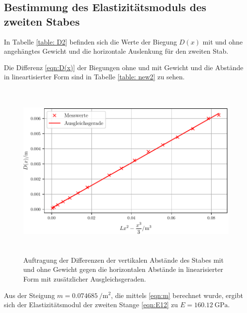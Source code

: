 \subsection{Bestimmung des Elastizitätsmoduls des zweiten Stabes}


In Tabelle \ref{table: D2} befinden sich die Werte der Biegung $D(x)$
mit und ohne angehängtes Gewicht und die horizontale Auslenkung %
für den zweiten Stab.

\noindent Die Differenz \eqref{eqn:D(x)} der Biegungen ohne und mit Gewicht und die Abstände in
lineartisierter Form sind in Tabelle \ref{table: new2} zu sehen.

\begin{figure}

  \centering
  \includegraphics[width=12cm, height=9cm]{./plots/Stange2.pdf}
  \caption{Auftragung der Differenzen der vertikalen Abstände des Stabes mit und ohne Gewicht gegen die horizontalen Abstände in linearisierter Form mit zusätzlicher Ausgleichsgeraden.}
  \label{fig:plot2}
\end{figure}
Aus der Steigung $m = \SI[per-mode=fraction]{0.074685}{\per\square\meter}$, die mittels \eqref{eqn:m}
berechnet wurde, ergibt sich der Elastizitätsmodul der zweiten Stange \eqref{eqn:E12} zu
$E = \SI{160.12}{\giga\pascal}$.
\newpage

